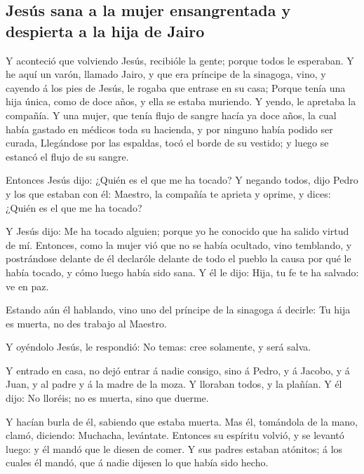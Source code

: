 \hypertarget{jesuxfas-sana-a-la-mujer-ensangrentada-y-despierta-a-la-hija-de-jairo}{%
\subsection{Jesús sana a la mujer ensangrentada y despierta a la hija de
Jairo}\label{jesuxfas-sana-a-la-mujer-ensangrentada-y-despierta-a-la-hija-de-jairo}}

 Y aconteció que volviendo Jesús, recibióle la gente;
porque todos le esperaban.  Y he aquí un varón, llamado
Jairo, y que era príncipe de la sinagoga, vino, y cayendo á los pies de
Jesús, le rogaba que entrase en su casa;  Porque tenía
una hija única, como de doce años, y ella se estaba muriendo. Y yendo,
le apretaba la compañía.  Y una mujer, que tenía flujo de
sangre hacía ya doce años, la cual había gastado en médicos toda su
hacienda, y por ninguno había podido ser curada, 
Llegándose por las espaldas, tocó el borde de su vestido; y luego se
estancó el flujo de su sangre.

 Entonces Jesús dijo: ¿Quién es el que me ha tocado? Y
negando todos, dijo Pedro y los que estaban con él: Maestro, la compañía
te aprieta y oprime, y dices: ¿Quién es el que me ha tocado?

 Y Jesús dijo: Me ha tocado alguien; porque yo he
conocido que ha salido virtud de mí.  Entonces, como la
mujer vió que no se había ocultado, vino temblando, y postrándose
delante de él declaróle delante de todo el pueblo la causa por qué le
había tocado, y cómo luego había sido sana.  Y él le
dijo: Hija, tu fe te ha salvado: ve en paz.

 Estando aún él hablando, vino uno del príncipe de la
sinagoga á decirle: Tu hija es muerta, no des trabajo al Maestro.

 Y oyéndolo Jesús, le respondió: No temas: cree
solamente, y será salva.

 Y entrado en casa, no dejó entrar á nadie consigo, sino
á Pedro, y á Jacobo, y á Juan, y al padre y á la madre de la moza.
 Y lloraban todos, y la plañían. Y él dijo: No lloréis;
no es muerta, sino que duerme.

 Y hacían burla de él, sabiendo que estaba muerta.
 Mas él, tomándola de la mano, clamó, diciendo: Muchacha,
levántate.  Entonces su espíritu volvió, y se levantó
luego: y él mandó que le diesen de comer.  Y sus padres
estaban atónitos; á los cuales él mandó, que á nadie dijesen lo que
había sido hecho.

